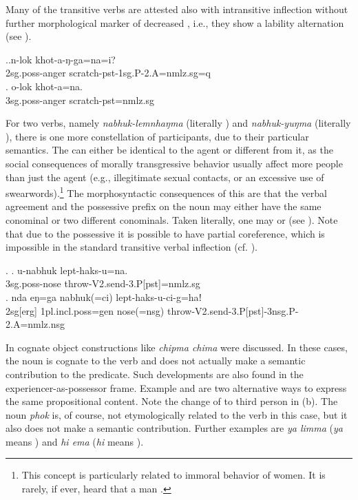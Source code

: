 Many of the transitive verbs are attested also with intransitive inflection without further morphological marker of decreased , i.e., they show a lability alternation (see \Next).

 \ex.\ag.n-lok  khot-a-ŋ-ga=na=i?\\
	{\sc 2sg.poss}-anger scratch{\sc -pst-1sg.P-2.A=nmlz.sg=q}	\\
\bg.  o-lok khot-a=na.\\
{\sc 3sg.poss-}anger scratch{\sc [3sg]-pst=nmlz.sg}\\


For two verbs, namely \emph{nabhuk-lemnhaŋma}  (literally ) and \emph{nabhuk-yuŋma}  (literally ), there is one more constellation of participants, due to their particular semantics. The  can either be identical to the agent or different from it, as the social consequences of morally transgressive behavior usually affect more people than just the agent (e.g., illegitimate sexual contacts, or an excessive use of swearwords).\footnote{This concept is particularly related to immoral behavior of women. It is rarely, if ever, heard that a man .} The morphosyntactic consequences of this are that the verbal agreement and the possessive prefix on the noun may either have the same conominal or two different conominals. Taken literally, one may  or  (see \Next). Note that due to the possessive  it is possible to have partial coreference, which is impossible in the standard transitive verbal inflection (cf. ).


\ex. \ag. u-nabhuk lept-haks-u=na.\\
{\sc 3sg.poss-}nose throw{\sc -V2.send-3.P[pst]=nmlz.sg}\\
\bg. nda eŋ=ga nabhuk(=ci) lept-haks-u-ci-g=haǃ\\
{\sc 2sg[erg]} {\sc 1pl.incl.poss=gen} nose({\sc =nsg}) throw{\sc -V2.send-3.P[pst]-3nsg.P-2.A=nmlz.nsg}\\

In  cognate object constructions like \emph{chipma chima}  were discussed. In these cases, the noun is cognate to the verb and does not actually make a semantic contribution to the predicate. Such developments are also found in the experiencer-as-possessor frame. Example \Next[a] and \Next[b] are two alternative ways to express the same propositional content. Note the change of  to third person in (b). The noun \emph{phok}  is, of course, not etymologically related to the verb in this case, but it also does not make a semantic contribution. Further examples are \emph{ya limma}  (\emph{ya} means ) and \emph{hi ema}  (\emph{hi} means ).

